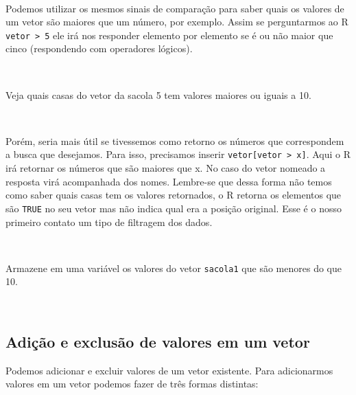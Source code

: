 \documentclass[]{book}
\theoremstyle{definition}
\theoremstyle{definition}
\theoremstyle{definition}
\theoremstyle{remark}
\let\BeginKnitrBlock\begin \let\EndKnitrBlock\end
\begin{document}
~

Podemos utilizar os mesmos sinais de comparação para saber quais os valores de um vetor são maiores que um número, por exemplo. Assim se perguntarmos ao R \texttt{vetor\ \textgreater{}\ 5} ele irá nos responder elemento por elemento se é ou não maior que cinco (respondendo com operadores lógicos).

~

\BeginKnitrBlock{exercise}
\protect\hypertarget{exr:unnamed-chunk-38}{}{\label{exr:unnamed-chunk-38} }Veja quais casas do vetor da sacola 5 tem valores maiores ou iguais a 10.
\EndKnitrBlock{exercise}

~

Porém, seria mais útil se tivessemos como retorno os números que correspondem a busca que desejamos. Para isso, precisamos inserir \texttt{vetor{[}vetor\ \textgreater{}\ x{]}}. Aqui o R irá retornar os números que são maiores que x. No caso do vetor nomeado a resposta virá acompanhada dos nomes. Lembre-se que dessa forma não temos como saber quais casas tem os valores retornados, o R retorna os elementos que são \texttt{TRUE} no seu vetor mas não indica qual era a posição original. Esse é o nosso primeiro contato um tipo de filtragem dos dados.

~

\BeginKnitrBlock{exercise}
\protect\hypertarget{exr:unnamed-chunk-39}{}{\label{exr:unnamed-chunk-39} }Armazene em uma variável os valores do vetor \texttt{sacola1} que são menores do que 10.
\EndKnitrBlock{exercise}

~

\hypertarget{adiuxe7uxe3o-e-exclusuxe3o-de-valores-em-um-vetor}{%
\subsection{Adição e exclusão de valores em um vetor}\label{adiuxe7uxe3o-e-exclusuxe3o-de-valores-em-um-vetor}}

Podemos adicionar e excluir valores de um vetor existente. Para adicionarmos valores em um vetor podemos fazer de três formas distintas:
\end{document}
